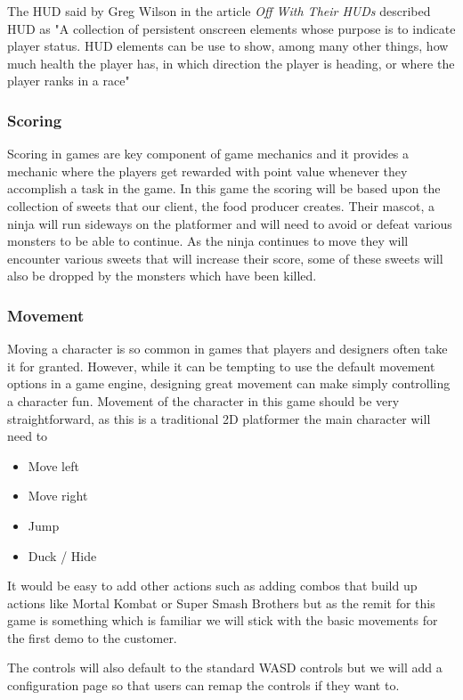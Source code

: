 \documentclass{article}
\begin{document}
The HUD said by Greg Wilson in the article \textit{Off With Their HUDs} described HUD as "A collection of persistent onscreen elements whose purpose is to indicate player status. HUD elements can be use to show, among many other things, how much health the player has, in which direction the player is heading, or where the player ranks in a race" 



\subsubsection{Scoring}
Scoring in games are key component of game mechanics and it provides a mechanic where the players get rewarded with point value whenever they accomplish a task in the game.   
In this game the scoring will be based upon the collection of sweets that our client, the food producer creates. Their mascot, a ninja will run sideways on the platformer and will need to avoid or defeat various monsters to be able to continue. As the ninja continues to move they will encounter various sweets that will increase their score, some of these sweets will also be dropped by the monsters which have been killed.

\subsubsection{Movement}
Moving a character is so common in games that players and designers often take it for granted. However, while it can be tempting to use the default movement options in a game engine, designing great movement can make simply controlling a character fun. 
Movement of the character in this game should be very straightforward, as this is a traditional 2D platformer the main character will need to
\begin{itemize}
\item Move left
\item Move right
\item Jump
\item Duck / Hide
\end{itemize}

It would be easy to add other actions such as adding combos that build up actions like Mortal Kombat or Super Smash Brothers but as the remit for this game is something which is familiar we will stick with the basic movements for the first demo to the customer.

The controls will also default to the standard WASD controls but we will add a configuration page so that users can remap the controls if they want to.
\end{document}
